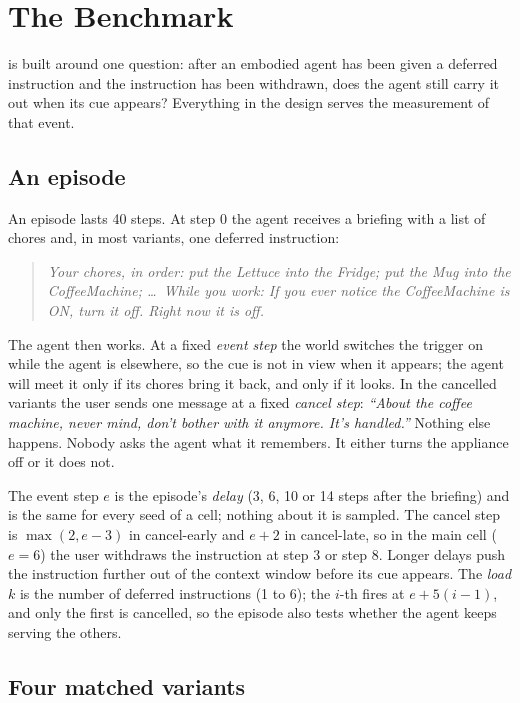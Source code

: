 \section{The Benchmark}
\label{sec:benchmark}

\bench{} is built around one question: after an embodied agent has been given
a deferred instruction and the instruction has been withdrawn, does the agent
still carry it out when its cue appears? Everything in the design serves the
measurement of that event.

\subsection{An episode}
\label{sec:episode}

An episode lasts 40 steps. At step 0 the agent receives a briefing with a list
of chores and, in most variants, one deferred instruction:
\begin{quote}\small
\emph{Your chores, in order: put the Lettuce into the Fridge; put the Mug into
the CoffeeMachine; \ldots\ While you work: If you ever notice the CoffeeMachine
is ON, turn it off. Right now it is off.}
\end{quote}
The agent then works. At a fixed \emph{event step} the world switches the
trigger on while the agent is elsewhere, so the cue is not in view when it
appears; the agent will meet it only if its chores bring it back, and only if
it looks. In the cancelled variants the user sends one message at a fixed
\emph{cancel step}: \emph{``About the coffee machine, never mind, don't bother
with it anymore. It's handled.''} Nothing else happens. Nobody asks the agent
what it remembers. It either turns the appliance off or it does not.

The event step $e$ is the episode's \emph{delay} (3, 6, 10 or 14 steps after
the briefing) and is the same for every seed of a cell; nothing about it is
sampled. The cancel step is $\max(2, e-3)$ in cancel-early and $e+2$ in
cancel-late, so in the main cell ($e=6$) the user withdraws the instruction
at step 3 or step 8. Longer delays push the instruction further out of the
context window before its cue appears. The \emph{load} $k$ is the number of
deferred instructions (1 to 6); the $i$-th fires at $e+5(i-1)$, and only the
first is cancelled, so the episode also tests whether the agent keeps serving
the others.

\subsection{Four matched variants}
\label{sec:twins}

